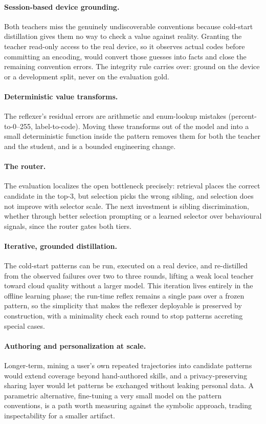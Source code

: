 \paragraph{Session-based device grounding.} Both teachers miss the genuinely
undiscoverable conventions because cold-start distillation gives them no way to
check a value against reality. Granting the teacher read-only access to the real
device, so it observes actual codes before committing an encoding, would convert
those guesses into facts and close the remaining convention errors. The integrity
rule carries over: ground on the device or a development split, never on the
evaluation gold.

\paragraph{Deterministic value transforms.} The reflexer's residual errors are
arithmetic and enum-lookup mistakes (percent-to-0--255, label-to-code). Moving
these transforms out of the model and into a small deterministic function inside
the pattern removes them for both the teacher and the student, and is a bounded
engineering change.

\paragraph{The router.} The evaluation localizes the open bottleneck precisely:
retrieval places the correct candidate in the top-3, but selection picks the wrong
sibling, and selection does not improve with selector scale. The next investment
is sibling discrimination, whether through better selection prompting or a learned
selector over behavioural signals, since the router gates both tiers.

\paragraph{Iterative, grounded distillation.} The cold-start patterns can be run,
executed on a real device, and re-distilled from the observed failures over two to
three rounds, lifting a weak local teacher toward cloud quality without a larger
model. This iteration lives entirely in the offline learning phase; the run-time
reflex remains a single pass over a frozen pattern, so the simplicity that makes
the reflexer deployable is preserved by construction, with a minimality check each
round to stop patterns accreting special cases.

\paragraph{Authoring and personalization at scale.} Longer-term, mining a user's
own repeated trajectories into candidate patterns would extend coverage beyond
hand-authored skills, and a privacy-preserving sharing layer would let patterns be
exchanged without leaking personal data. A parametric alternative, fine-tuning a
very small model on the pattern conventions, is a path worth measuring against the
symbolic approach, trading inspectability for a smaller artifact.


